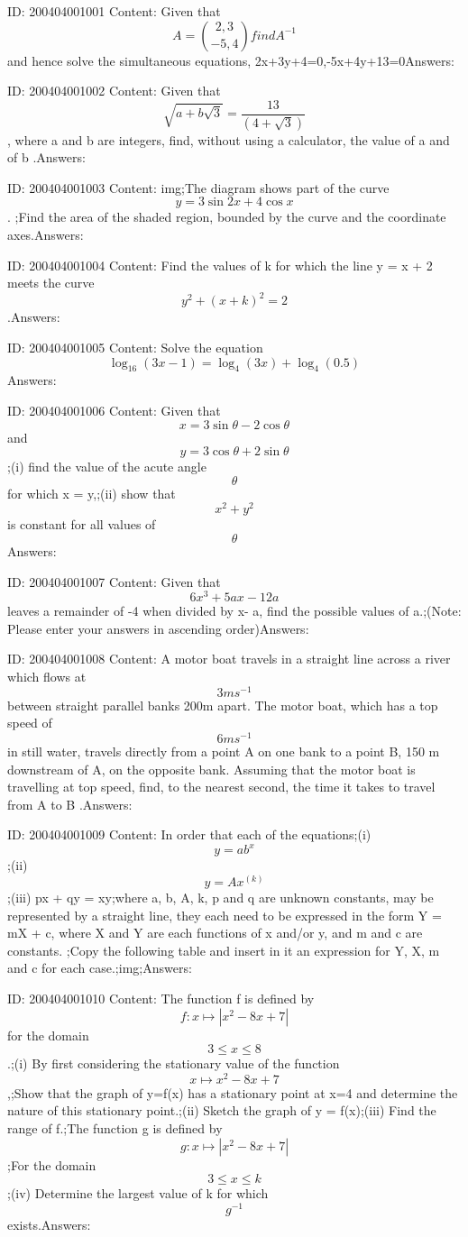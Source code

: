 \documentclass{article}
\begin{document}
ID: 200404001001
Content:
Given that $$A=\binom{2,3}{-5,4} find A^{-1}$$ and hence solve the simultaneous equations, 2x+3y+4=0,-5x+4y+13=0Answers:

ID: 200404001002
Content:
Given that $$\sqrt{a+b \sqrt3}= \frac{13}{(4+\sqrt3)}$$, where a and b are integers, find, without using a calculator, the value of a and of b .Answers:

ID: 200404001003
Content:
img;The diagram shows part of the curve $$y = 3 \sin  2x + 4 \cos  x$$. ;Find the area of the shaded region, bounded by the curve and the coordinate axes.Answers:

ID: 200404001004
Content:
Find the values of k for which the line y = x + 2 meets the curve $$y^2+(x+k)^2=2$$.Answers:

ID: 200404001005
Content:
Solve the equation $$\log_16(3x-1)=\log_4(3x)+\log_4(0.5)$$Answers:

ID: 200404001006
Content:
Given that $$x=3\sin \theta - 2\cos  \theta$$ and $$y=3\cos  \theta + 2\sin  \theta$$;(i)	find the value of the acute angle $$\theta$$ for which x = y,;(ii)	show that $$x^2+y^2$$ is constant for all values of $$\theta$$Answers:

ID: 200404001007
Content:
Given that $$6x^3+5ax-12a$$ leaves a remainder of -4 when divided by x- a, find the possible values of a.;(Note: Please enter your answers in ascending order)Answers:

ID: 200404001008
Content:
A motor boat travels in a straight line across a river which flows at \[3ms^{-1}\] between straight parallel banks 200m apart. The motor boat, which has a top speed of \[6 ms^{-1}\] in still water, travels directly from a point A on one bank to a point B, 150 m downstream of A, on the opposite bank. Assuming that the motor boat is travelling at top speed, find, to the nearest second, the time it takes to travel from A to B .Answers:

ID: 200404001009
Content:
In order that each of the equations;(i) $$y=ab^x$$;(ii) $$y=Ax^{(k)}$$;(iii) px + qy = xy;where a, b, A, k, p and q are unknown constants, may be represented by a straight line, they each need to be expressed in the form Y = mX + c, where X and Y are each functions of x and/or y, and m and c are constants. ;Copy the following table and insert in it an expression for Y, X, m and c for each case.;img;Answers:

ID: 200404001010
Content:
The function f is defined by $$f: x \mapsto |x^2-8x+7|$$ for the domain $$3\leq x\leq8$$.;(i) By first considering the stationary value of the function $$x \mapsto x^2-8x+7$$,;Show that the graph of y=f(x) has a stationary point at x=4 and determine the nature of this stationary point.;(ii) Sketch the graph of y = f(x);(iii) Find the range of f.;The function g is defined by $$g: x \mapsto |x^2-8x+7|$$;For the domain $$3\leq x\leq k$$;(iv) Determine the largest value of k for which $$g^{-1}$$ exists.Answers:
\end{document}

